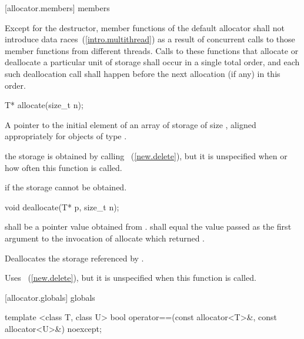 [allocator.members]{ members}

\pnum
Except for the destructor, member functions of the default allocator shall not introduce
data races~(\ref{intro.multithread}) as a result of concurrent calls to those member
functions from different threads. Calls to these functions that allocate or deallocate a
particular unit of storage shall occur in a single total order, and each such
deallocation call shall happen before the next allocation (if any) in this order.

%
\begin{itemdecl}
T* allocate(size_t n);
\end{itemdecl}

\begin{itemdescr}
\pnum
\returns
A pointer to the initial element of an array of storage of size 
, aligned appropriately for objects of type .

\pnum
\remarks
the storage is obtained by calling ~(\ref{new.delete}),
but it is unspecified when or how often this
function is called.

\pnum
\throws
{} if the storage cannot be obtained.
\end{itemdescr}

%
\begin{itemdecl}
void deallocate(T* p, size_t n);
\end{itemdecl}

\begin{itemdescr}
\pnum
\requires
{} shall be a pointer value obtained from .
 shall equal the value passed as the first argument
to the invocation of allocate which returned .

\pnum
\effects
Deallocates the storage referenced by  .

\pnum
\remarks
Uses
~(\ref{new.delete}),
but it is unspecified
when this function is called.
\end{itemdescr}

[allocator.globals]{ globals}

%
\begin{itemdecl}
template <class T, class U>
  bool operator==(const allocator<T>&, const allocator<U>&) noexcept;
\end{itemdecl}

